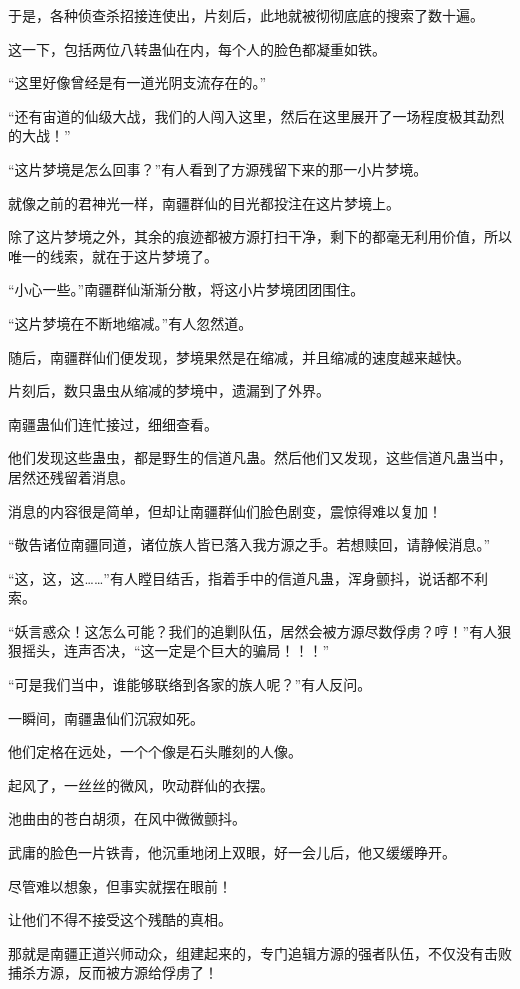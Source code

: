 \begin{this_body}
于是，各种侦查杀招接连使出，片刻后，此地就被彻彻底底的搜索了数十遍。

这一下，包括两位八转蛊仙在内，每个人的脸色都凝重如铁。

“这里好像曾经是有一道光阴支流存在的。”

“还有宙道的仙级大战，我们的人闯入这里，然后在这里展开了一场程度极其勐烈的大战！”

“这片梦境是怎么回事？”有人看到了方源残留下来的那一小片梦境。

就像之前的君神光一样，南疆群仙的目光都投注在这片梦境上。

除了这片梦境之外，其余的痕迹都被方源打扫干净，剩下的都毫无利用价值，所以唯一的线索，就在于这片梦境了。

“小心一些。”南疆群仙渐渐分散，将这小片梦境团团围住。

“这片梦境在不断地缩减。”有人忽然道。

随后，南疆群仙们便发现，梦境果然是在缩减，并且缩减的速度越来越快。

片刻后，数只蛊虫从缩减的梦境中，遗漏到了外界。

南疆蛊仙们连忙接过，细细查看。

他们发现这些蛊虫，都是野生的信道凡蛊。然后他们又发现，这些信道凡蛊当中，居然还残留着消息。

消息的内容很是简单，但却让南疆群仙们脸色剧变，震惊得难以复加！

“敬告诸位南疆同道，诸位族人皆已落入我方源之手。若想赎回，请静候消息。”

“这，这，这……”有人瞠目结舌，指着手中的信道凡蛊，浑身颤抖，说话都不利索。

“妖言惑众！这怎么可能？我们的追剿队伍，居然会被方源尽数俘虏？哼！”有人狠狠摇头，连声否决，“这一定是个巨大的骗局！！！”

“可是我们当中，谁能够联络到各家的族人呢？”有人反问。

一瞬间，南疆蛊仙们沉寂如死。

他们定格在远处，一个个像是石头雕刻的人像。

起风了，一丝丝的微风，吹动群仙的衣摆。

池曲由的苍白胡须，在风中微微颤抖。

武庸的脸色一片铁青，他沉重地闭上双眼，好一会儿后，他又缓缓睁开。

尽管难以想象，但事实就摆在眼前！

让他们不得不接受这个残酷的真相。

那就是南疆正道兴师动众，组建起来的，专门追辑方源的强者队伍，不仅没有击败捕杀方源，反而被方源给俘虏了！


\end{this_body}
